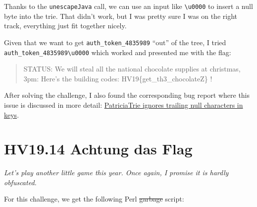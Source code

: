 \documentclass[11pt]{article}
\begin{document}
Thanks to the \texttt{unescapeJava} call, we can use an input like
\texttt{\textbackslash{}u0000} to insert a null byte into the trie. That
didn't work, but I was pretty sure I was on the right track, everything
just fit together nicely.

Given that we want to get \texttt{auth\_token\_4835989} ``out'' of the
tree, I tried \texttt{auth\_token\_4835989\textbackslash{}u0000} which
worked and presented me with the flag:

\begin{quote}
STATUS: We will steal all the national chocolate supplies at christmas,
3pm: Here's the building codes: HV19\{get\_th3\_chocolateZ\} !
\end{quote}

After solving the challenge, I also found the corresponding bug report
where this issue is discussed in more detail:
\href{https://issues.apache.org/jira/browse/COLLECTIONS-714}{PatriciaTrie
ignores trailing null characters in keys}.


    
\pagebreak{}
    \hypertarget{hv19.14-achtung-das-flag}{%
\section{HV19.14 Achtung das Flag}\label{hv19.14-achtung-das-flag}}

\emph{Let's play another little game this year. Once again, I promise it
is hardly obfuscated.}

For this challenge, we get the following Perl \sout{garbage} script:
\end{document}
